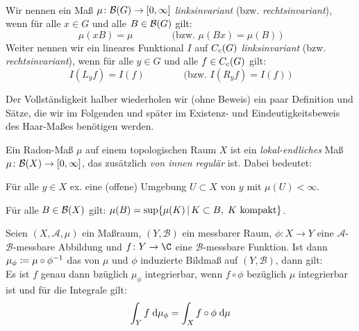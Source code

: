 \begin{thDef}\hfill\\
    Wir nennen ein Maß $\mu\colon \mathcal{B}(G) \to [0,\infty]$
    \emph{linksinvariant} (bzw. \emph{rechtsinvariant}), 
    wenn für alle $x\in G$ und alle $B\in\mathcal{B}(G)$ gilt:
    \[  \mu(xB) = \mu  
        \qquad\qquad\bigl(\text{bzw. } 
        \mu(Bx) = \mu(B) 
        \,\bigr)
    \]
    Weiter nennen wir ein lineares Funktional $I$ auf $C_c(G)$ 
    \emph{linksinvariant} (bzw. \emph{rechtsinvariant}),
    wenn für alle $y\in G$ und alle $f\in C_c(G)$ gilt:
    \[  I(L_yf) = I(f) 
        \qquad\qquad\bigl(\text{bzw. } 
        I(R_yf) = I(f)
        \,\bigr)
    \]
\end{thDef}

\medskip
Der Vollständigkeit halber wiederholen wir (ohne Beweis) 
ein paar Definition und Sätze, die wir im Folgenden und später im Existenz- und
Eindeutigkeitsbeweis des Haar-Maßes  benötigen werden.

\begin{thDef}
    \label{tg:def:radonmeasure}
    Ein Radon-Maß $\mu$ auf einem topologischen Raum $X$ ist ein
    \emph{lokal-endliches} Maß $\mu\colon\mathcal{B}(X)\to[0,\infty]$, das
    zusätzlich \emph{von innen regulär} ist.
    Dabei bedeutet:
    \begin{description}[align=left, 
                        itemindent=15pt, 
                        leftmargin=0pt, 
                        itemsep=0pt,
                        topsep=0.3\baselineskip]
        \item[lokal-endlich:]
            Für alle $y\in X$ ex. eine (offene) Umgebung $U\subset X$ von
            $y$ mit $\mu(U) < \infty$.
        \item[von innen regulär:]
            Für alle $B\in\mathcal{B}(X)$ gilt:
            $\mu(B) = \sup\{ \mu(K) \Mid K\subset B,\; K\text{ kompakt} \}$.
    \end{description}
\end{thDef}

\begin{thSatz}
    \label{tg:trafo}
    Seien $(X,\mathcal{A},\mu)$ ein Maßraum, $(Y,\mathcal{B})$ ein
    messbarer Raum, $\phi\colon X\to Y$ eine $\mathcal{A}$-$\mathcal{B}$-messbare
    Abbildung und $f\colon Y\to\C$ eine $\mathcal{B}$-messbare Funktion.
    Ist dann $\mu_\phi \coloneqq \mu \circ \phi^{-1}$ das von $\mu$ und $\phi$
    induzierte Bildmaß auf $(Y,\mathcal{B})$, dann gilt:
    \\
    Es ist $f$ genau dann bzüglich $\mu_\phi$ integrierbar, wenn $f\circ\phi$
    bezüglich $\mu$ integrierbar ist und für die Integrale gilt:
    \[ \int_Y f \;\mathrm{d} \mu_\phi = \int_X f\circ\phi \;\mathrm{d} \mu \]
\end{thSatz}

